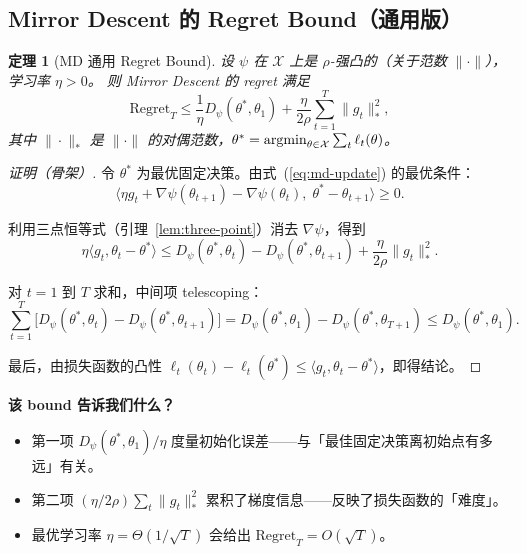 \documentclass[12pt,a4paper]{ctexart}
\theoremstyle{definition}
\theoremstyle{plain}
\newtheorem{theorem}{定理}[section]
\theoremstyle{remark}
\newcommand{\cX}{\mathcal{X}}
\newcommand{\argmin}{\operatornamewithlimits{argmin}}
\newcommand{\Regret}{\mathrm{Regret}}
\begin{document}
\subsection{Mirror Descent 的 Regret Bound（通用版）}

\begin{theorem}[MD 通用 Regret Bound]\label{thm:md-regret}
设 $\psi$ 在 $\cX$ 上是 $\rho$-强凸的（关于范数 $\|\cdot\|$），学习率 $\eta > 0$。
则 Mirror Descent 的 regret 满足
\begin{equation}\label{eq:md-regret-bound}
  \Regret_T \le \frac{1}{\eta} D_\psi(\theta^*, \theta_1)
    + \frac{\eta}{2\rho} \sum_{t=1}^{T} \|g_t\|_*^2,
\end{equation}
其中 $\|\cdot\|_*$ 是 $\|\cdot\|$ 的对偶范数，$\theta^* = \argmin_{\theta\in\cX} \sum_t \ell_t(\theta)$。
\end{theorem}

\begin{proof}[证明（骨架）]
令 $\theta^*$ 为最优固定决策。由式~(\ref{eq:md-update}) 的最优条件：
\[
  \langle \eta g_t + \nabla\psi(\theta_{t+1}) - \nabla\psi(\theta_t),\; \theta^* - \theta_{t+1} \rangle \ge 0.
\]

利用三点恒等式（引理~\ref{lem:three-point}）消去 $\nabla\psi$，得到
\[
  \eta\langle g_t, \theta_t - \theta^*\rangle
  \le D_\psi(\theta^*, \theta_t) - D_\psi(\theta^*, \theta_{t+1})
    + \frac{\eta}{2\rho}\|g_t\|_*^2.
\]

对 $t=1$ 到 $T$ 求和，中间项 telescoping：
\[
  \sum_{t=1}^{T} \big[ D_\psi(\theta^*, \theta_t) - D_\psi(\theta^*, \theta_{t+1}) \big]
  = D_\psi(\theta^*, \theta_1) - D_\psi(\theta^*, \theta_{T+1})
  \le D_\psi(\theta^*, \theta_1).
\]

最后，由损失函数的凸性 $\ell_t(\theta_t) - \ell_t(\theta^*) \le \langle g_t, \theta_t - \theta^* \rangle$，即得结论。
\end{proof}

\textbf{该 bound 告诉我们什么？}
\begin{itemize}
  \item 第一项 $D_\psi(\theta^*, \theta_1)/\eta$ 度量初始化误差——与「最佳固定决策离初始点有多远」有关。
  \item 第二项 $(\eta/2\rho)\sum_t \|g_t\|_*^2$ 累积了梯度信息——反映了损失函数的「难度」。
  \item 最优学习率 $\eta = \Theta(1/\sqrt{T})$ 会给出 $\Regret_T = O(\sqrt{T})$。
\end{itemize}

\end{document}
